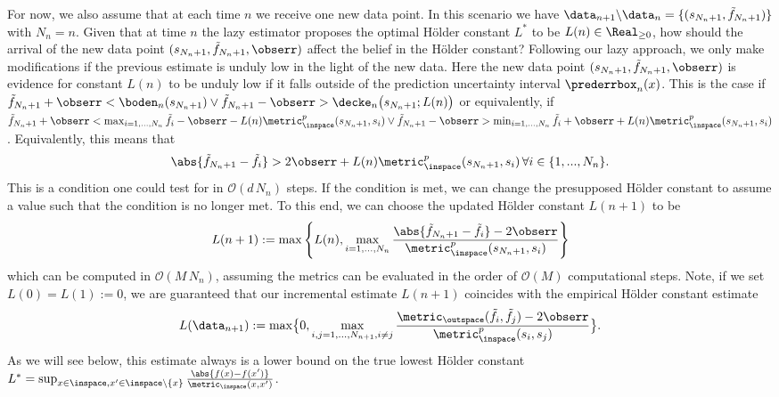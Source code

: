 For now, we also assume that at each time $n$ we receive one new data point. In this scenario we have $\data_{n+1} \backslash \data_n=\{(s_{N_n+1},\tilde f_{N_n+1}) \}$ with $N_n = n$. Given that at time $n$ the lazy estimator proposes the optimal H\"older constant $L^*$ to be $L(n) \in \Real_{\geq 0}$, how should the arrival of the new data point $(s_{N_n+1},\tilde f_{N_n+1},\obserr)$ affect the belief in the H\"older constant? %
Following our lazy approach, we only make modifications if the previous estimate is unduly low in the light of the new data. Here the new data point $(s_{N_n+1},\tilde f_{N_n+1},\obserr)$ is evidence for constant $L(n)$ to be unduly low if it falls outside of the prediction uncertainty  interval $\prederrbox_n(x)$. This is the case if 
$\tilde f_{N_n+1} +\obserr < \boden_n(s_{{N_n}+1}) \vee \tilde f_{{N_n}+1} - \obserr > \decke_n\bigl(s_{{N_n}+1}; L(n)\bigr)$ or equivalently, if 
$\tilde f_{{N_n}+1} +\obserr < \max_{i=1,\dots,N_n} \tilde f_i - \obserr - L(n) \metric^p_{\inspace}(s_{{N_n}+1},s_i) \vee \tilde f_{{N_n}+1} - \obserr > \min_{i=1,\dots,N_n} \tilde f_i + \obserr + L(n) \metric^p_{\inspace}(s_{{N_n}+1},s_i)$.
Equivalently, this means that 
\begin{equation}
	\abs{\tilde f_{{N_n}+1} -\tilde f_i} > 2 \obserr +  L(n) \metric^p_{\inspace}(s_{N_n+1},s_i) \, \forall i \in \{1,...,N_n\}. 
\label{eq:Lupdatecond}
\end{equation}
This is a condition one could test for in $\mathcal O(d \, N_n)$ steps. If the condition is met, we can change the presupposed H\"older constant  to assume a value such that the condition is no longer met. To this end, we can choose the updated H\"older constant $L({n+1})$ to be 
%
\begin{equation}
	L({n+1}) := \max\left\{ L(n), \max_{i=1,...,N_n} \frac{\abs{\tilde f_{{N_n}+1}-\tilde f_i} -  2 \obserr}{\metric^p_{\inspace}(s_{N_n+1},s_i)} \right\}
\label{eq:Lupdateeq}
\end{equation}
which can be computed in $\mathcal O(M \, N_n)$, assuming the metrics can be evaluated in the order of $\mathcal O(M)$ computational steps. 
%
Note, if we set $L(0) = L(1) := 0$, we are guaranteed that our incremental estimate $L({n+1}) $ coincides with the empirical H\"older constant estimate $$L({\data_{n+1}} ) :=  \max \bigl\{0,\max_{i,j =1,...,N_{n+1}, i\neq j} \frac{\metric_\outspace(\tilde f_i,\tilde f_j) -2 \obserr}{\metric^p_{\inspace}(s_i,s_j)} \bigr\}.$$ As we will see below, this estimate always is a lower bound on the true lowest H\"older constant $L^* = \sup_{x \in \inspace, x' \in \inspace\backslash \{x\}} \frac{\abs{f(x) - f(x')}}{\metric_{\inspace}(x,x') }$.



